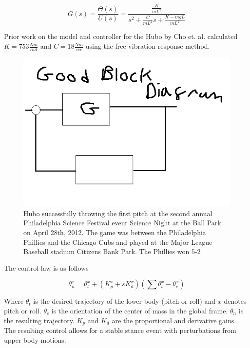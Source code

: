 \begin{equation}
G(s) = \frac{\Theta(s)}{U(s)} = \frac{\frac{K}{mL^2}}{s^2+\frac{C}{mL^2}s + \frac{K-mgL}{mL^2}}
\end{equation}

Prior work on the model and controller for the Hubo by Cho et. al. calculated $K=753\frac{Nm}{rad}$ and $C=18\frac{Nm}{sec}$ using the free vibration response method\cite{5379574}.


\begin{figure}[h]
  \centering
\includegraphics[width=1.0\columnwidth]{./pix/blockDiagram.png}
  \caption{Hubo successfully throwing the first pitch at the second annual Philadelphia Science Festival event Science Night at the Ball Park on April 28th, 2012.  The game was between the Philadelphia Phillies and the Chicago Cubs and played at the Major League Baseball stadium Citizens Bank Park.  The Phillies won 5-2}
  \label{fig:ctrlBlockDiagram}
\end{figure}

The control law is as follows

\begin{equation}
\theta_{n}^x = \theta_{t}^x + (K_p^x+sK_d^x)(\sum \theta_{t}^x - \theta_{c}^x)
\end{equation}

Where $\theta_t$ is the desired trajectory of the lower body (pitch or roll) and $x$ denotes pitch or roll.  $\theta_{c}$ is the orientation of the center of mass in the global frame.  $\theta_n$ is the resulting trajectory.  $K_p$ and $K_d$ are the proportional and derivative gains.  The resulting control allows for a stable stance event with perturbations from upper body motions.
